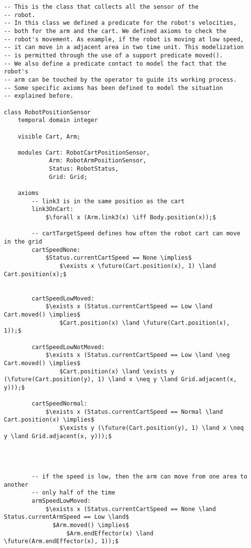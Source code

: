 \begin{lstlisting}[fontadjust, mathescape, frame=single] 
-- This is the class that collects all the sensor of the
-- robot.
-- In this class we defined a predicate for the robot's velocities,
-- both for the arm and the cart. We defined axioms to check the
-- robot's movement. As example, if the robot is moving at low speed,
-- it can move in a adjacent area in two time unit. This modelization
-- is permitted through the use of a support predicate moved().
-- We also define a predicate contact to model the fact that the robot's
-- arm can be touched by the operator to guide its working process.
-- Some specific axioms has been defined to model the situation
-- explained before.

class RobotPositionSensor
    temporal domain integer

    visible Cart, Arm;

    modules Cart: RobotCartPositionSensor,
             Arm: RobotArmPositionSensor,
             Status: RobotStatus,
             Grid: Grid;

    axioms
        -- link3 is in the same position as the cart
        link3OnCart: 
            $\forall x (Arm.link3(x) \iff Body.position(x));$

        -- cartTargetSpeed defines how often the robot cart can move in the grid
        cartSpeedNone: 
            $Status.currentCartSpeed == None \implies$ 
                $\exists x \future(Cart.position(x), 1) \land Cart.position(x);$

                
        cartSpeedLowMoved: 
            $\exists x (Status.currentCartSpeed == Low \land Cart.moved() \implies$
                $Cart.position(x) \land \future(Cart.position(x), 1));$

        cartSpeedLowNotMoved: 
            $\exists x (Status.currentCartSpeed == Low \land \neg Cart.moved() \implies$
                $Cart.position(x) \land \exists y (\future(Cart.position(y), 1) \land x \neq y \land Grid.adjacent(x, y)));$

        cartSpeedNormal: 
            $\exists x (Status.currentCartSpeed == Normal \land Cart.position(x) \implies$
                $\exists y (\future(Cart.position(y), 1) \land x \neq y \land Grid.adjacent(x, y)));$




        -- if the speed is low, then the arm can move from one area to another
        -- only half of the time
        armSpeedLowMoved: 
            $\exists x (Status.currentCartSpeed == None \land Status.currentArmSpeed == Low \land$
              $Arm.moved() \implies$ 
                  $Arm.endEffector(x) \land \future(Arm.endEffector(x), 1));$


\end{lstlisting}
